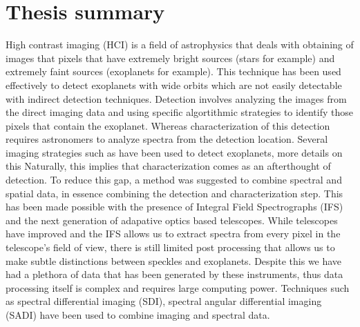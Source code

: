 \chapter*{Thesis summary}
High contrast imaging (HCI) is a field of astrophysics that deals with obtaining of images that pixels that have extremely bright sources (stars for example) and extremely faint sources (exoplanets for example).
This technique has been used effectively to detect exoplanets with wide orbits which are not easily detectable with indirect detection techniques.
Detection involves analyzing the images from the direct imaging data and using specific algortithmic strategies to identify those pixels that contain the exoplanet.
Whereas characterization of this detection requires astronomers to analyze spectra from the detection location.
Several imaging strategies such as \citep[ADI, ][]{2006MaroisADI} have been used to detect exoplanets, more details on this 
Naturally, this implies that characterization comes as an afterthought of detection.
To reduce this gap, a method was suggested to combine spectral and spatial data, in essence combining the detection 
and characterization step.
This has been made possible with the presence of Integral Field Spectrographs (IFS) and the next generation of adapative optics based 
telescopes.
While telescopes have improved and the IFS allows us to extract spectra from every pixel in the telescope's field of view, there is still 
limited post processing that allows us to make subtle distinctions between speckles and exoplanets.
Despite this we have had a plethora of data that has been generated by these instruments, thus data processing itself is complex and requires 
large computing power.
Techniques such as spectral differential imaging (SDI), spectral angular differential imaging (SADI) have been used to combine imaging and spectral data.

